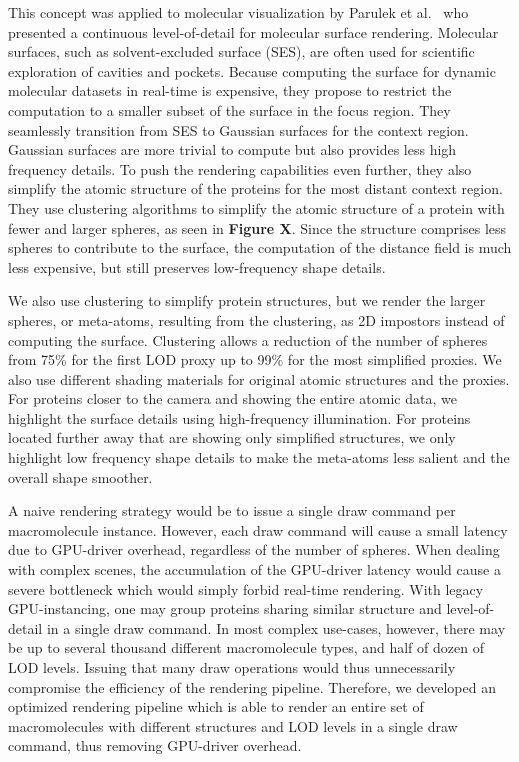 This concept was applied to molecular visualization by Parulek et al.~\cite{parulek2014continuous} who presented a continuous level-of-detail for molecular surface rendering.
Molecular surfaces, such as solvent-excluded surface (SES), are often used for scientific exploration of cavities and pockets.
Because computing the surface for dynamic molecular datasets in real-time is expensive, they propose to restrict the computation to a smaller subset of the surface in the focus region.
They seamlessly transition from SES to Gaussian surfaces for the context region.
Gaussian surfaces are more trivial to compute but also provides less high frequency details.
To push the rendering capabilities even further, they also simplify the atomic structure of the proteins for the most distant context region.
They use clustering algorithms to simplify the atomic structure of a protein with fewer and larger spheres, as seen in \textbf{Figure X}.
Since the structure comprises less spheres to contribute to the surface, the computation of the distance field is much less expensive, but still preserves low-frequency shape details.

We also use clustering to simplify protein structures, but we render the larger spheres, or meta-atoms, resulting from the clustering, as 2D impostors instead of computing the surface.
Clustering allows a reduction of the number of spheres from 75\% for the first LOD proxy up to 99\% for the most simplified proxies.
We also use different shading materials for original atomic structures and the proxies.
For proteins closer to the camera and showing the entire atomic data, we highlight the surface details using high-frequency illumination.
For proteins located further away that are showing only simplified structures, we only highlight low frequency shape details to make the meta-atoms less salient and the overall shape smoother.

A naive rendering strategy would be to issue a single draw command per macromolecule instance.
However, each draw command will cause a small latency due to GPU-driver overhead, regardless of the number of spheres.
When dealing with complex scenes, the accumulation of the GPU-driver latency would cause a severe bottleneck which would simply forbid real-time rendering.
With legacy GPU-instancing, one may group proteins sharing similar structure and level-of-detail in a single draw command.
In most complex use-cases, however, there may be up to several thousand different macromolecule types, and half of dozen of LOD levels.
Issuing that many draw operations would thus unnecessarily compromise the efficiency of the rendering pipeline.
Therefore, we developed an optimized rendering pipeline which is able to render an entire set of macromolecules with different structures and LOD levels in a single draw command, thus removing GPU-driver overhead.


